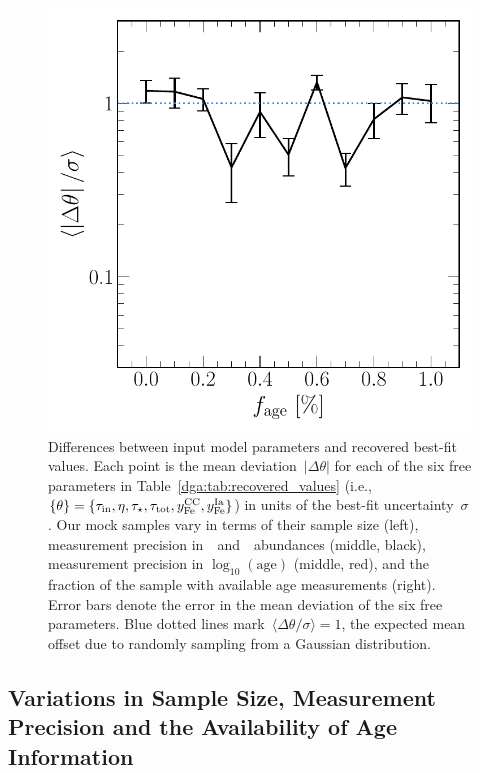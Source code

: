 {\begin{landscape}
\begin{figure}
\includegraphics[scale = 0.5]{dp_sigma_agefrac.pdf}
\caption{
Differences between input model parameters and recovered best-fit values.
Each point is the mean deviation~$\left|\Delta\theta\right|$ for each of the
six free parameters in Table~\ref{dga:tab:recovered_values} (i.e.,
$\{\theta\} = \{\tau_\text{in}, \eta, \tau_\star, \tau_\text{tot}, y_\text{Fe}^\text{CC},
y_\text{Fe}^\text{Ia}\}$) in units of the best-fit uncertainty~$\sigma$.
Our mock samples vary in terms of their sample size (left), measurement
precision in~\feh~and~\afe~abundances (middle, black), measurement precision in
$\log_{10}(\text{age})$ (middle, red), and the fraction of the sample with
available age measurements (right).
Error bars denote the error in the mean deviation of the six free parameters.
Blue dotted lines mark~$\langle \Delta \theta / \sigma \rangle = 1$, the
expected mean offset due to randomly sampling from a Gaussian distribution.
}
\label{dga:fig:accuracy}
\end{figure}
\end{landscape}
\clearpage
}

\subsection{Variations in Sample Size, Measurement Precision and the
Availability of Age Information}
\label{dga:sec:mocks:variations}

